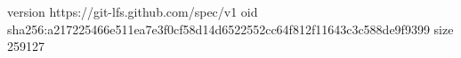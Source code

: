 version https://git-lfs.github.com/spec/v1
oid sha256:a217225466e511ea7e3f0cf58d14d6522552cc64f812f11643c3c588de9f9399
size 259127
